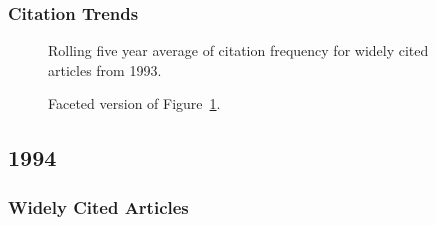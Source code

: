 \documentclass[
  10pt,
  letterpaper,
  DIV=11,
  numbers=noendperiod,
  twoside]{scrartcl}
\begin{document}
\subsubsection*{Citation Trends}\label{sec-trends-1993}

\begin{figure}


\caption{\label{fig-citation-spaghetti-1993}Rolling five year average of
citation frequency for widely cited articles from 1993.}

\end{figure}%

\begin{figure}


\caption{\label{fig-citation-facet-1993}Faceted version of
Figure~\ref{fig-citation-spaghetti-1993}.}

\end{figure}%

\newpage

\subsection{1994}\label{sec-s1994}

\subsubsection*{Widely Cited Articles}\label{widely-cited-articles-38}
\end{document}
